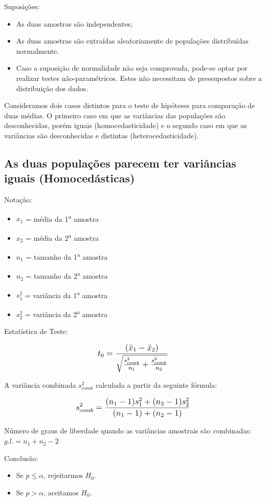 Suposições:
\begin{itemize}
	\item As duas amostras são independentes;
	\item As duas amostras são extraídas aleatoriamente de populações distribuídas normalmente.
	\item Caso a suposição de normalidade não seja comprovada, pode-se optar por realizar testes não-paramétricos. Estes não necessitam de pressupostos sobre a distribuição dos dados.
\end{itemize}

Consideramos dois casos distintos para o teste de hipóteses para comparação de duas médias. O primeiro caso em que as variâncias das populações são desconhecidas, porém iguais (homocedasticidade) e o segundo caso em que as variâncias são desconhecidas e distintas (heterocedasticidade).

\subsection{As duas populações parecem ter variâncias iguais (Homocedásticas)}

Notação:
\begin{itemize}
	\item \(x_1\) = média da 1\textsuperscript{a} amostra
	\item \(x_2\) = média da 2\textsuperscript{a} amostra
	\item \(n_1\) = tamanho da 1\textsuperscript{a} amostra
	\item \(n_2\) = tamanho da 2\textsuperscript{a} amostra
	\item \(s_1^2\) = variância da 1\textsuperscript{a} amostra
	\item \(s_2^2\) = variância da 2\textsuperscript{a} amostra 
\end{itemize}


Estatística de Teste:

\[\beq{ t_0 = \frac{(\bar{x}_1-\bar{x}_2)}{\sqrt{\frac{s_{comb}^2}{n_1} + \frac{s_{comb}^2}{n_2}}} }\]

A variância combinada \(s_{comb}^2\) calculada a partir da seguinte fórmula:

\[\beq{ s_{comb}^2 = \frac{(n_1-1)s_1^2 + (n_2-1)s_2^2}{(n_1-1)+(n_2-1)}  }\]

Número de graus de liberdade quando as variâncias amostrais são combinadas: \( g.l. = n_1 + n_2 - 2 \)

Conclusão:
\begin{itemize}
	\item Se \(p \leq \alpha\), rejeitarmos \(H_0\).
	\item Se \(p > \alpha\), aceitamos \(H_0\).
\end{itemize}

